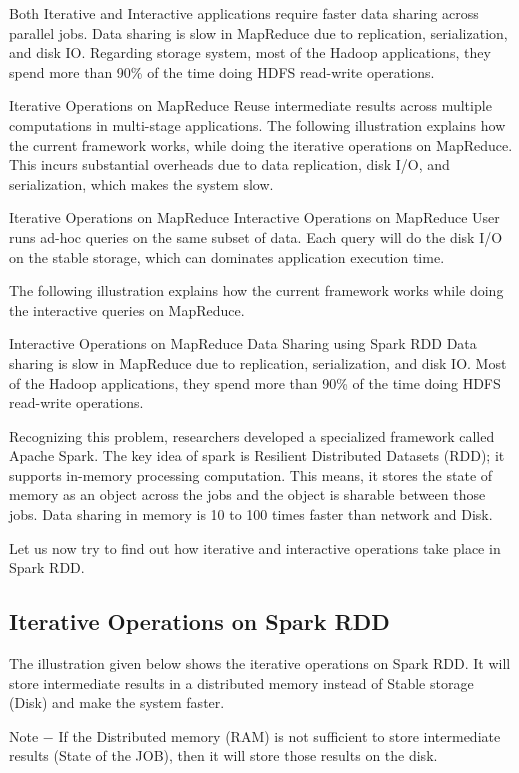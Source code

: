 \documentclass[a4paper,12pt]{article}
\begin{document}
Both Iterative and Interactive applications require faster data sharing across parallel jobs. Data sharing is slow in MapReduce due to replication, serialization, and disk IO. Regarding storage system, most of the Hadoop applications, they spend more than 90\% of the time doing HDFS read-write operations.

Iterative Operations on MapReduce
Reuse intermediate results across multiple computations in multi-stage applications. The following illustration explains how the current framework works, while doing the iterative operations on MapReduce. This incurs substantial overheads due to data replication, disk I/O, and serialization, which makes the system slow.

Iterative Operations on MapReduce
Interactive Operations on MapReduce
User runs ad-hoc queries on the same subset of data. Each query will do the disk I/O on the stable storage, which can dominates application execution time.

The following illustration explains how the current framework works while doing the interactive queries on MapReduce.

Interactive Operations on MapReduce
Data Sharing using Spark RDD
Data sharing is slow in MapReduce due to replication, serialization, and disk IO. Most of the Hadoop applications, they spend more than 90\% of the time doing HDFS read-write operations.

Recognizing this problem, researchers developed a specialized framework called Apache Spark. The key idea of spark is Resilient Distributed Datasets (RDD); it supports in-memory processing computation. This means, it stores the state of memory as an object across the jobs and the object is sharable between those jobs. Data sharing in memory is 10 to 100 times faster than network and Disk.

Let us now try to find out how iterative and interactive operations take place in Spark RDD.

\subsection*{Iterative Operations on Spark RDD}
The illustration given below shows the iterative operations on Spark RDD. It will store intermediate results in a distributed memory instead of Stable storage (Disk) and make the system faster.

Note − If the Distributed memory (RAM) is not sufficient to store intermediate results (State of the JOB), then it will store those results on the disk.
\end{document}
